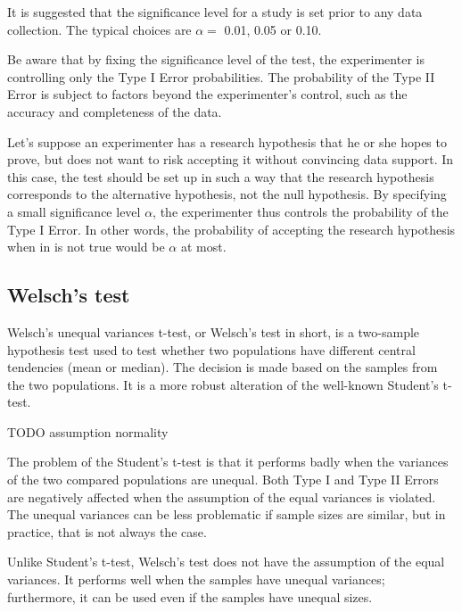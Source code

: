 It is suggested that the significance level for a study is set prior to any data collection. \cite{neynman_pearson}
The typical choices are $\alpha =$ 0.01, 0.05 or 0.10. \cite{casella}

Be aware that by fixing the significance level of the test, the experimenter is controlling only the Type I Error probabilities. The probability of the Type II Error is subject to factors beyond the experimenter's control, such as the accuracy and completeness of the data. \cite{sham_purcell}

Let's suppose an experimenter has a research hypothesis that he or she hopes to prove, but does not want to risk accepting it without convincing data support. In this case, the test should be set up in such a way that the research hypothesis corresponds to the alternative hypothesis, not the null hypothesis. By specifying a small significance level $\alpha$, the experimenter thus controls the probability of the Type I Error. In other words, the probability of accepting the research hypothesis when in is not true would be $\alpha$ at most. \cite{casella}



\subsection{Welsch's test}

Welsch's unequal variances t-test, or Welsch's test in short, is a two-sample hypothesis test used to test whether two populations have different central tendencies (mean or median). The decision is made based on the samples from the two populations. It is a more robust alteration of the well-known Student's t-test. \cite{welsch}

TODO assumption normality

The problem of the Student's t-test is that it performs badly when the variances of the two compared populations are unequal. Both Type I and Type II Errors are negatively affected when the assumption of the equal variances is violated. The unequal variances can be less problematic if sample sizes are similar, but in practice, that is not always the case. \cite{ruxton}

Unlike Student's t-test, Welsch's test does not have the assumption of the equal variances. It performs well when the samples have unequal variances; furthermore, it can be used even if the samples have unequal sizes.\cite{derrick}

